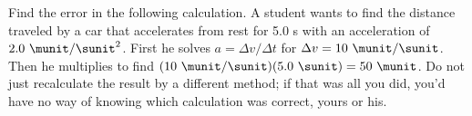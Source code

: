 Find the error in the following calculation. A student
wants to find the distance traveled by a car that accelerates
from rest for 5.0 s with an acceleration of $2.0\ \munit/\sunit^2$.
First he solves $a=\Delta v/\Delta t$ for $\Delta v=10 \ \munit/\sunit$.
Then he multiplies to find $(10\ \munit/\sunit)(5.0\ \sunit)=50\ \munit$. Do not
just recalculate the result by a different method; if that
was all you did, you'd have no way of knowing which
calculation was correct, yours or his.

